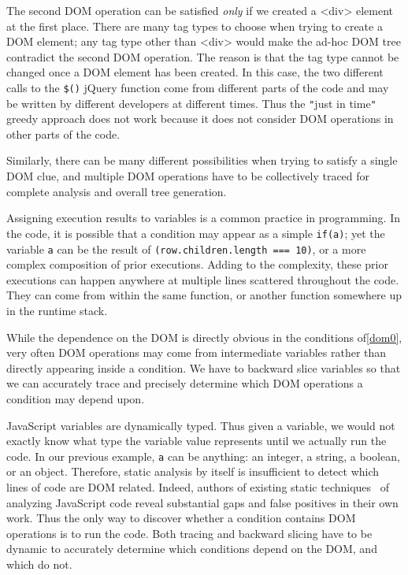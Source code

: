 
The second DOM operation can be satisfied {\em only} if we created a <div> element at the first place.  
There are many tag types to choose when trying to create a DOM element; any tag type other than <div> would make the ad-hoc DOM tree contradict the second DOM operation.  
The reason is that the tag type cannot be changed once a DOM element has been created.  
In this case, the two different calls to the {\tt \$()} jQuery function come from different parts of the code and may be written by different developers at different times.  
Thus the {\tt "}just in time{\tt "} greedy approach does not work because it does not consider DOM operations in other parts of the code.  

Similarly, there can be many different possibilities when trying to satisfy a single DOM clue, and multiple DOM operations have to be collectively traced for complete analysis and overall tree generation.   

Assigning execution results to variables is a common practice in programming.  
In the code, it is possible that a condition may appear as a simple {\tt if(a)}; yet the variable {\tt a} can be the result of {\tt (row.children.length === 10)}, or a more complex composition of prior executions. 
Adding to the complexity, these prior executions can happen anywhere at multiple lines scattered throughout the code.  
They can come from within the same function, or another function somewhere up in the runtime stack.

While the dependence on the DOM is directly obvious in the conditions of\autoref{dom0}, very often DOM operations may come from intermediate variables rather than directly appearing inside a condition.  
We have to backward slice variables so that we can accurately trace and precisely determine which DOM operations a condition may depend upon.  

JavaScript variables are dynamically typed.  Thus given a variable, we would not exactly know what type the variable value represents until we actually run the code.  
In our previous example, {\tt a} can be anything: an integer, a string, a boolean, or an object.  
Therefore, static analysis by itself is insufficient to detect which lines of code are DOM related.  
Indeed, authors of existing static techniques~\cite{staticJsWWW09, staticJsWWW11} of analyzing JavaScript code reveal substantial gaps and false positives in their own work.  
Thus the only way to discover whether a condition contains DOM operations is to run the code.  
Both tracing and backward slicing have to be dynamic to accurately determine which conditions depend on the DOM, and which do not.  

